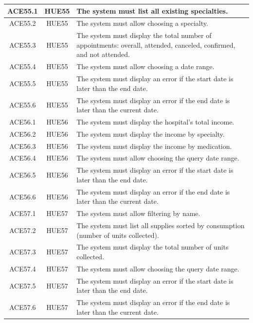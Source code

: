 \documentclass{prgrado}
\begin{document}
\begin{longtable}{|c|c|p{9cm}|}
ACE55.1 & HUE55 & The system must list all existing specialties. \\ \hline
ACE55.2 & HUE55 & The system must allow choosing a specialty. \\ \hline
ACE55.3 & HUE55 & The system must display the total number of appointments: overall, attended, canceled, confirmed, and not attended. \\ \hline
ACE55.4 & HUE55 & The system must allow choosing a date range. \\ \hline
ACE55.5 & HUE55 & The system must display an error if the start date is later than the end date. \\ \hline
ACE55.6 & HUE55 & The system must display an error if the end date is later than the current date. \\ \hline

ACE56.1 & HUE56 & The system must display the hospital's total income. \\ \hline
ACE56.2 & HUE56 & The system must display the income by specialty. \\ \hline
ACE56.3 & HUE56 & The system must display the income by medication. \\ \hline
ACE56.4 & HUE56 & The system must allow choosing the query date range. \\ \hline
ACE56.5 & HUE56 & The system must display an error if the start date is later than the end date. \\ \hline
ACE56.6 & HUE56 & The system must display an error if the end date is later than the current date. \\ \hline

ACE57.1 & HUE57 & The system must allow filtering by name. \\ \hline
ACE57.2 & HUE57 & The system must list all supplies sorted by consumption (number of units collected). \\ \hline
ACE57.3 & HUE57 & The system must display the total number of units collected. \\ \hline
ACE57.4 & HUE57 & The system must allow choosing the query date range. \\ \hline
ACE57.5 & HUE57 & The system must display an error if the start date is later than the end date. \\ \hline
ACE57.6 & HUE57 & The system must display an error if the end date is later than the current date. \\ \hline
\end{longtable}
\end{document}

